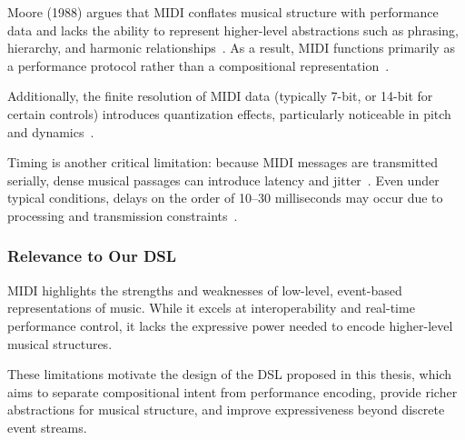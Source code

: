 Moore (1988) argues that MIDI conflates musical structure with performance data and lacks the ability to
represent higher-level abstractions such as phrasing, hierarchy, and harmonic relationships~\cite{Moore_1988}.
As a result, MIDI functions primarily as a performance protocol rather than a compositional
representation~\cite{Moore_1988}.

Additionally, the finite resolution of MIDI data (typically 7-bit, or 14-bit for certain controls) introduces
quantization effects, particularly noticeable in pitch and dynamics~\cite{Moore_1988}.

Timing is another critical limitation: because MIDI messages are transmitted serially, dense musical passages
can introduce latency and jitter~\cite{Moog_1986}.
Even under typical conditions, delays on the order of 10–30 milliseconds may occur due to processing and
transmission constraints~\cite{Moog_1986}.


\subsubsection{Relevance to Our DSL}

MIDI highlights the strengths and weaknesses of low-level, event-based representations of music.
While it excels at interoperability and real-time performance control, it lacks the expressive power needed
to encode higher-level musical structures.

These limitations motivate the design of the DSL proposed in this thesis, which aims to separate
compositional intent from performance encoding, provide richer abstractions for musical structure, and
improve expressiveness beyond discrete event streams.
